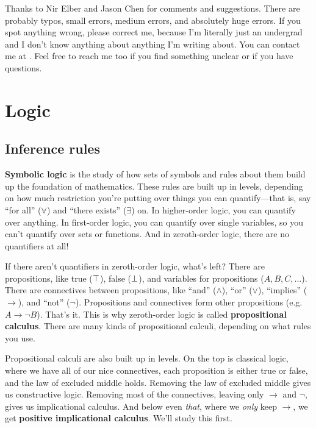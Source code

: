 \documentclass[11pt,paper=letter]{scrartcl}
\renewcommand{\land}{\wedge}
\renewcommand{\lor}{\vee}
\renewcommand{\lnot}{\neg}
\begin{document}
Thanks to Nir Elber and Jason Chen for comments and suggestions. There are probably typos, small errors, medium errors, and absolutely huge errors. If you spot anything wrong, please correct me, because I'm literally just an undergrad and I don't know anything about anything I'm writing about. You can contact me at . Feel free to reach me too if you find something unclear or if you have questions.

\clearpage

\section{Logic}

\subsection{Inference rules}

\textbf{Symbolic logic} is the study of how sets of symbols and rules about them build up the foundation of mathematics. These rules are built up in levels, depending on how much restriction you're putting over things you can quantify---that is, say ``for all'' ($\forall$) and ``there exists'' ($\exists$) on. In higher-order logic, you can quantify over anything. In first-order logic, you can quantify over single variables, so you can't quantify over sets or functions. And in zeroth-order logic, there are no quantifiers at all!

If there aren't quantifiers in zeroth-order logic, what's left? There are propositions, like true ($\top$), false ($\bot$), and variables for propositions ($A, B, C, \dots$). There are connectives between propositions, like ``and'' ($\land$), ``or'' ($\lor$), ``implies'' ($\to$), and ``not'' ($\lnot$). Propositions and connectives form other propositions (e.g. $A \to \lnot B$). That's it. This is why zeroth-order logic is called \textbf{propositional calculus}. There are many kinds of propositional calculi, depending on what rules you use.

Propositional calculi are also built up in levels. On the top is classical logic, where we have all of our nice connectives, each proposition is either true or false, and the law of excluded middle holds. Removing the law of excluded middle gives us constructive logic. Removing most of the connectives, leaving only $\to$ and $\lnot$, gives us implicational calculus. And below even \emph{that}, where we \emph{only} keep $\to$, we get \textbf{positive implicational calculus}. We'll study this first.
\end{document}
